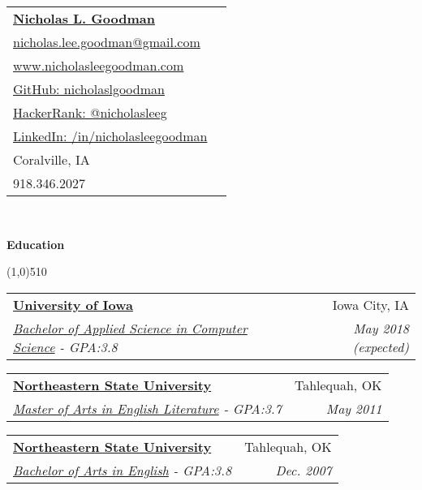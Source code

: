 \documentclass[letterpaper,11pt]{article}
\makeatletter
\newcommand{\resheading}[1]{{\large {\begin{minipage}{\textwidth}{\textbf{#1 \vphantom{p\^{E}}}}\end{minipage}}}}
\newcommand{\ressubheading}[4]{
\begin{tabular*}{6.5in}{l@{\extracolsep{\fill}}r}
		\textbf{#1} & #2 \\
		\textit{#3} & \textit{#4} \\
\end{tabular*}\vspace{-6pt}}
\makeatother
\begin{document}
\newcommand{\mywebheader}{
\begin{tabular*}{7in}{l@{\extracolsep{\fill}}r}
	\textbf{\href{http://www.nicholasleegoodman.com/}{\LARGE Nicholas L. Goodman}}\\
	\href{mailto:nicholas.lee.goodman@gmail.com}{nicholas.lee.goodman@gmail.com}\\
	\href{http://www.nicholasleegoodman.com}{www.nicholasleegoodman.com} \\ 
	\href{https://github.com/nicholaslgoodman}{GitHub: nicholaslgoodman} \\
	\href{https://www.hackerrank.com/nicholasleeg}{HackerRank: @nicholasleeg} \\ 
	\href{https://www.linkedin.com/in/nicholasleegoodman}{LinkedIn: /in/nicholasleegoodman} \\
	
	{Coralville, IA} \\
	{918.346.2027}
	\end{tabular*}
\\
\renewcommand{\labelitemi}{$-$}

\vspace{0.1in}}

\mywebheader



\resheading {Education}

\line(1,0){510}

	\begin{description}

		\item
			\ressubheading {\href{http://www.truman.edu}{University of Iowa}}{Iowa City, IA}{\href{http://www.truman.edu/majors-programs/majors-minors/computer-science-major/}{Bachelor of Applied Science in Computer Science} - {GPA:3.8}}{ \footnotesize{May 2018 (expected)}}

		\item	
			\ressubheading{\href{http://www.nsuok.edu}{Northeastern State University}}{Tahlequah, OK}{\href{https://www.nsuok.edu/Academics/DegreesMajors/GraduateMasters.aspx}{Master of Arts in English Literature} - {GPA:3.7}}{ \footnotesize{May 2011}}
		\item	
			\ressubheading{\href{http://www.nsuok.edu}{Northeastern State University}}{Tahlequah, OK}{\href{https://www.nsuok.edu/Academics/DegreesMajors/Tahlequah.aspx}{Bachelor of Arts in English} - {GPA:3.8}}{ \footnotesize{Dec. 2007}}
		\end{description} %
\end{document}
